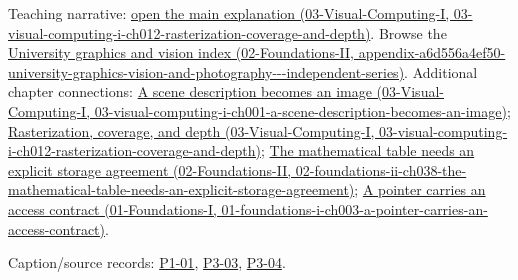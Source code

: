 Teaching narrative: \href{../03-Visual-Computing-I/main.pdf\#nameddest=03-visual-computing-i-ch012-rasterization-coverage-and-depth}{open the main explanation (03-Visual-Computing-I, 03-visual-computing-i-ch012-rasterization-coverage-and-depth)}. Browse the \href{../02-Foundations-II/main.pdf\#nameddest=appendix-a6d556a4ef50-university-graphics-vision-and-photography---independent-series}{University graphics and vision index (02-Foundations-II, appendix-a6d556a4ef50-university-graphics-vision-and-photography-\/-\/-independent-series)}. Additional chapter connections: \href{../03-Visual-Computing-I/main.pdf\#nameddest=03-visual-computing-i-ch001-a-scene-description-becomes-an-image}{A scene description becomes an image (03-Visual-Computing-I, 03-visual-computing-i-ch001-a-scene-description-becomes-an-image)}; \href{../03-Visual-Computing-I/main.pdf\#nameddest=03-visual-computing-i-ch012-rasterization-coverage-and-depth}{Rasterization, coverage, and depth (03-Visual-Computing-I, 03-visual-computing-i-ch012-rasterization-coverage-and-depth)}; \href{../02-Foundations-II/main.pdf\#nameddest=02-foundations-ii-ch038-the-mathematical-table-needs-an-explicit-storage-agreement}{The mathematical table needs an explicit storage agreement (02-Foundations-II, 02-foundations-ii-ch038-the-mathematical-table-needs-an-explicit-storage-agreement)}; \href{../01-Foundations-I/main.pdf\#nameddest=01-foundations-i-ch003-a-pointer-carries-an-access-contract}{A pointer carries an access contract (01-Foundations-I, 01-foundations-i-ch003-a-pointer-carries-an-access-contract)}.

Caption/source records: \hyperref[04-visual-computing-ii-ch036-p1-01---module-1.1-course-intro-administrivia-part-1-graphics-visual-computing-2026]{P1-01}, \hyperref[04-visual-computing-ii-ch036-p3-03---moving-objects-in-space]{P3-03}, \hyperref[04-visual-computing-ii-ch036-p3-04---rotations-about-an-arbitrary-axis]{P3-04}.
